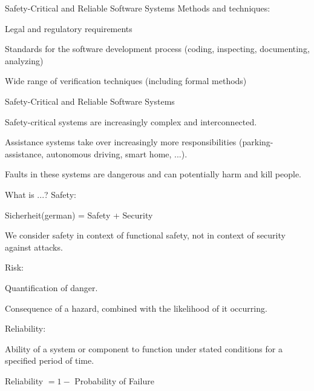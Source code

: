 \begin{frame}{Safety-Critical and Reliable Software Systems}
	Methods and techniques:
	\begin{beameritemize}
		\item Legal and regulatory requirements
		\item Standards for the software development process (coding, inspecting, documenting, analyzing)		
		\item Wide range of verification techniques (including formal methods)
	\end{beameritemize}	
\end{frame}



\begin{frame}{Safety-Critical and Reliable Software Systems}
	
	\begin{beameritemize}
		\item Safety-critical systems are increasingly complex and interconnected.
		\item Assistance systems take over increasingly more responsibilities (parking-assistance, autonomous driving, smart home, ...).
		\item Faults in these systems are dangerous and can potentially harm and kill people.
	\end{beameritemize}	
	
\end{frame}


\begin{frame}{What is ...?}
Safety:
	\begin{beameritemize}
		\item Sicherheit(german) = Safety + Security
		\item We consider safety in context of functional safety, not in context of security against attacks.	
	\end{beameritemize}	
Risk:
	\begin{beameritemize}
		\item Quantification of danger.
		\item Consequence of a hazard, combined with the likelihood of it occurring.
	\end{beameritemize}	
Reliability:
	\begin{beameritemize}
		\item Ability of a system or component to function under stated conditions for a specified period of time.
		\item Reliability $=1-$ Probability of Failure
	\end{beameritemize}	
\end{frame}


